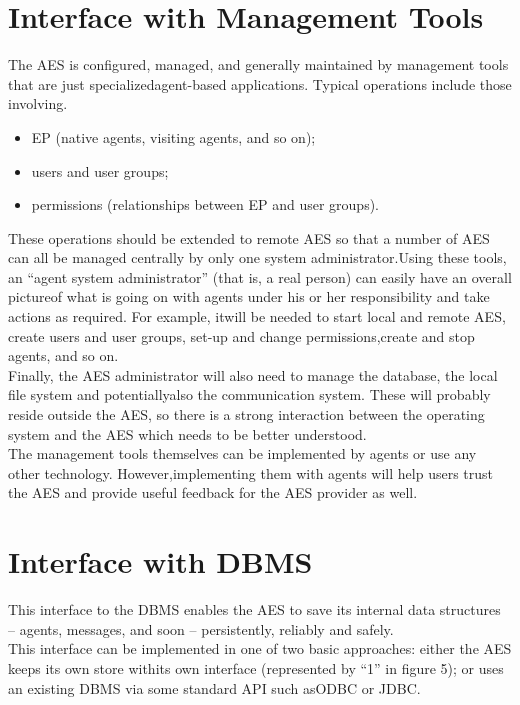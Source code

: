 \documentclass{article}
\begin{document}
\section{Interface with Management Tools}
The AES is configured, managed, and generally maintained by management tools that are just specializedagent-based applications. Typical operations include those involving.
\begin{itemize}
    \item EP (native agents, visiting agents, and so on);
    \item users and user groups;
    \item permissions (relationships between EP and user groups).
\end{itemize}
These operations should be extended to remote AES so that a number of AES can all be managed centrally by only one system administrator.Using these tools, an “agent system administrator” (that is, a real person) can easily have an overall pictureof what is going on with agents under his or her responsibility and take actions as required. For example, itwill be needed to start local and remote AES, create users and user groups, set-up and change permissions,create and stop agents, and so on.\\Finally, the AES administrator will also need to manage the database, the local file system and potentiallyalso the communication system. These will probably reside outside the AES, so there is a strong interaction between the operating system and the AES which needs to be better understood.\\
 
The management tools themselves can be implemented by agents or use any other technology. However,implementing them with agents will help users trust the AES and provide useful feedback for the AES provider as well.
\section{Interface with DBMS}
This interface to the DBMS enables the AES to save its internal data structures – agents, messages, and soon – persistently, reliably and safely.\\This interface can be implemented in one of two basic approaches: either the AES keeps its own store withits own interface (represented by “1” in figure 5); or uses an existing DBMS via some standard API such asODBC or JDBC.
\end{document}
